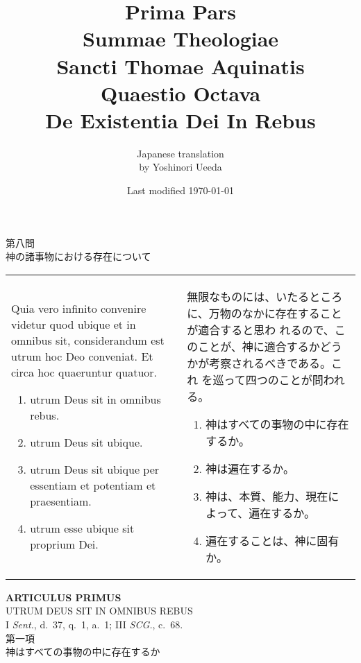 \documentclass[10pt]{jsarticle} %
\title{{\bf Prima Pars}\\{\HUGE Summae Theologiae}\\Sancti Thomae
Aquinatis\\Quaestio Octava\\{\bf De Existentia Dei In Rebus}}
\author{Japanese translation\\by Yoshinori {\sc Ueeda}}
\date{Last modified \today}
\begin{document}
\maketitle
\begin{center}
{\Large 第八問\\神の諸事物における存在について}
\end{center}



\begin{longtable}{p{21em}p{21em}}

Quia vero infinito convenire videtur quod ubique et in omnibus sit,
 considerandum est utrum hoc Deo conveniat. Et circa hoc quaeruntur
 quatuor. 
\begin{enumerate}
 \item utrum Deus sit in omnibus rebus.
 \item utrum Deus sit ubique.
 \item utrum Deus sit ubique per essentiam et potentiam et praesentiam.
 \item utrum esse ubique sit proprium Dei.
\end{enumerate}

&

無限なものには、いたるところに、万物のなかに存在することが適合すると思わ
 れるので、このことが、神に適合するかどうかが考察されるべきである。これ
 を巡って四つのことが問われる。
\begin{enumerate}
 \item 神はすべての事物の中に存在するか。
 \item 神は遍在するか。
 \item 神は、本質、能力、現在によって、遍在するか。
 \item 遍在することは、神に固有か。
\end{enumerate}
\end{longtable}

\newpage
{}
\begin{center}
 {\Large {\bf ARTICULUS PRIMUS}}\\
 {\large UTRUM DEUS SIT IN OMNIBUS REBUS}\\
 {\footnotesize I {\itshape Sent.}, d.~37, q.~1, a.~1; III {\itshape
 SCG.}, c.~68.}\\
 {\Large 第一項\\神はすべての事物の中に存在するか}
\end{center}
\end{document}
